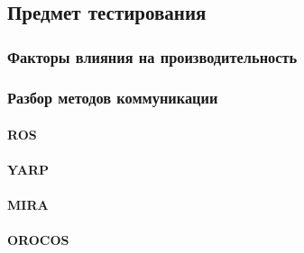 \chapter{}
\label{title:chapter2}

\section{Предмет тестирования}
\label{title:chapter2:performance_subject}
	\subsection{Факторы влияния на производительность \marm{}}
	\label{title:chapter2:performance_factors}
	
	
	\subsection{Разбор методов коммуникации \marm{}}
	\label{title:chapter2:performance_approaches}
		\subsubsection{ROS}
		\label{title:chapter2:performance_ros_approaches}
		
		
		\subsubsection{YARP}
		\label{title:chapter2:performance_yarp_approaches}
		

		\subsubsection{MIRA}
		\label{title:chapter2:performance_mira_approaches}
		
		
		\subsubsection{OROCOS}
		\label{title:chapter2:performance_orocos_approaches}
		

\section{}
	
